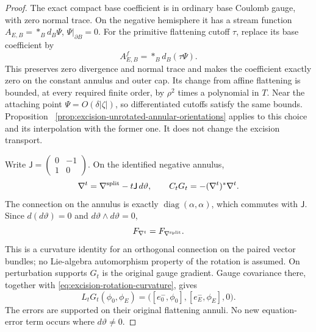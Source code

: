 \documentclass[11pt]{amsart}
\theoremstyle{definition}
\theoremstyle{remark}
\theoremstyle{plain}
\begin{document}
\begin{proof}
The exact compact base coefficient is in ordinary base
Coulomb gauge, with zero normal trace. On the negative
hemisphere it has a stream function
$A_{E,B}=*_B d_B\Psi$, $\Psi|_{\partial B}=0$.
For the primitive flattening cutoff $\tau$, replace its
base coefficient by
\[
                       A_{E,B}^f=*_B d_B(\tau\Psi).
\]
This preserves zero divergence and normal trace and makes
the coefficient exactly zero on the constant annulus and
outer cap. Its change from affine flattening is bounded,
at every required finite order, by $\rho^2$ times a
polynomial in $T$. Near the attaching point
$\Psi=O(\delta|\zeta|)$, so differentiated cutoffs satisfy
the same bounds. Proposition~
\ref{prop:excision-unrotated-annular-orientations} applies
to this choice and its interpolation with the former one.
It does not change the excision transport.

Write
$\mathsf J=\left(\begin{smallmatrix}0&-1\\1&0\end{smallmatrix}\right)$.
On the identified negative annulus,
\[
             \nabla^t=\nabla^{\rm split}-t\mathsf J\,d\vartheta,
                  \qquad C_tG_t=-(\nabla^t)^*\nabla^t .
\]
The connection on the annulus is exactly
$\operatorname{diag}(\alpha,\alpha)$, which commutes
with $\mathsf J$. Since $d(d\vartheta)=0$ and
$d\vartheta\wedge d\vartheta=0$,
\begin{equation}\label{eq:excision-rotation-curvature}
                 F_{\nabla^t}=F_{\nabla^{\rm split}} .
\end{equation}
This is a curvature identity for an orthogonal connection
on the paired vector bundles; no Lie-algebra automorphism
property of the rotation is assumed.
On perturbation supports $G_t$ is the original gauge
gradient. Gauge covariance there, together with
\eqref{eq:excision-rotation-curvature}, gives
\[
 L_tG_t(\phi_0,\phi_E)
       =\bigl([e_0^-,\phi_0],[e_E^-,\phi_E],0\bigr).
\]
The errors are supported on their original flattening
annuli. No new equation-error term occurs where
$d\vartheta\ne0$.


\end{proof}
\end{document}
